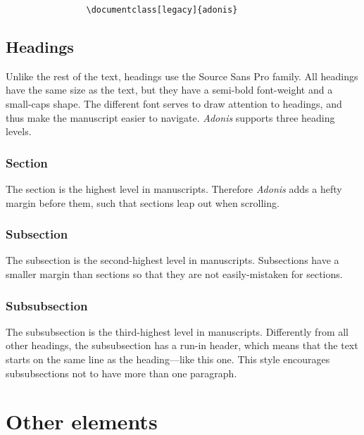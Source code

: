 \documentclass{adonis}
\begin{document}
			\begin{verbatim}
				\documentclass[legacy]{adonis}
			\end{verbatim}

		\subsection{Headings}
		
			Unlike the rest of the text, headings use the Source Sans Pro family.
			All headings have the same size as the text, but they have a semi-bold font-weight and a small-caps shape.
			The different font serves to draw attention to headings, and thus make the manuscript easier to navigate.
			\textit{Adonis} supports three heading levels.
		
			\subsubsection{Section}
			
				The section is the highest level in manuscripts.
				Therefore \textit{Adonis} adds a hefty margin before them, such that sections leap out when scrolling.
			
			\subsubsection{Subsection}
			
				The subsection is the second-highest level in manuscripts.
				Subsections have a smaller margin than sections so that they are not easily-mistaken for sections.
			
			\subsubsection{Subsubsection}
			
				The subsubsection is the third-highest level in manuscripts.
				Differently from all other headings, the subsubsection has a run-in header, which means that the text starts on the same line as the heading—like this one.
				This style encourages subsubsections not to have more than one paragraph.
			
	\section{Other elements}
	
\end{document}
